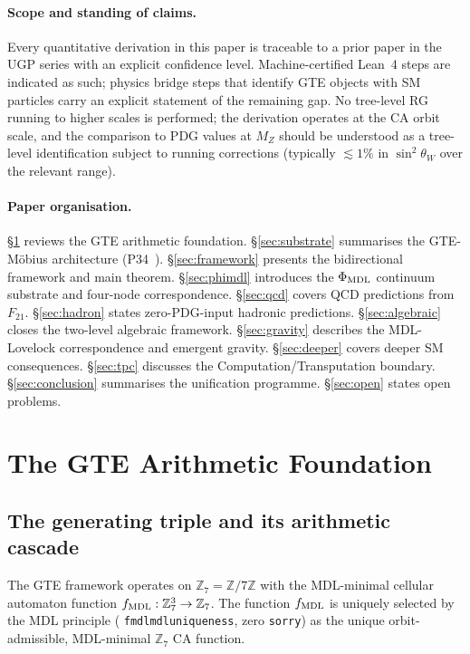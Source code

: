 \documentclass[11pt]{article}
\theoremstyle{remark}
\newcommand{\ZS}{\mathbb{Z}_7}
\newcommand{\fmdl}{f_{\rm MDL}}
\newcommand{\lean}[1]{%
  \penalty-100
  \begingroup\def\_{\textunderscore\allowbreak}\texttt{#1}\endgroup}
\newcommand{\sinwsq}{\sin^2\!\theta_W}
\newcommand{\phimdl}{\Phi_{\rm MDL}}
\newcommand{\Ftwentyone}{F_{21}}
\begin{document}
\paragraph{Scope and standing of claims.}
Every quantitative derivation in this paper is traceable to a prior paper in the
UGP series with an explicit confidence level. Machine-certified Lean~4 steps are
indicated as such; physics bridge steps that identify GTE objects with SM particles
carry an explicit statement of the remaining gap.
No tree-level RG running to higher scales is performed; the derivation operates at
the CA orbit scale, and the comparison to PDG values at $M_Z$ should be understood
as a tree-level identification subject to running corrections (typically $\lesssim
1\%$ in $\sinwsq$ over the relevant range).

\paragraph{Paper organisation.}
\S\ref{sec:foundation} reviews the GTE arithmetic foundation.
\S\ref{sec:substrate} summarises the GTE-M\"obius architecture (P34~\cite{SpivackGTEMobius}).
\S\ref{sec:framework} presents the bidirectional framework and main theorem.
\S\ref{sec:phimdl} introduces the $\phimdl$ continuum substrate and four-node correspondence.
\S\ref{sec:qcd} covers QCD predictions from $\Ftwentyone$.
\S\ref{sec:hadron} states zero-PDG-input hadronic predictions.
\S\ref{sec:algebraic} closes the two-level algebraic framework.
\S\ref{sec:gravity} describes the MDL-Lovelock correspondence and emergent gravity.
\S\ref{sec:deeper} covers deeper SM consequences.
\S\ref{sec:tpc} discusses the Computation/Transputation boundary.
\S\ref{sec:conclusion} summarises the unification programme.
\S\ref{sec:open} states open problems.

\section{The GTE Arithmetic Foundation}
\label{sec:foundation}

\subsection{The generating triple and its arithmetic cascade}
\label{sec:cascade}

The GTE framework operates on $\ZS = \mathbb{Z}/7\mathbb{Z}$ with the MDL-minimal
cellular automaton function $\fmdl : \ZS^3 \to \ZS$.
The function $\fmdl$ is uniquely selected by the MDL principle
(\lean{fmdl\_mdl\_uniqueness}, zero \texttt{sorry})
as the unique orbit-admissible, MDL-minimal $\ZS$ CA function.
\end{document}
